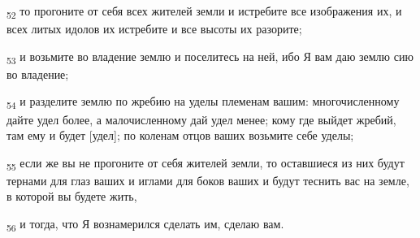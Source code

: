 \begin{tcolorbox}
\textsubscript{52} то прогоните от себя всех жителей земли и истребите все изображения их, и всех литых идолов их истребите и все высоты их разорите;
\end{tcolorbox}
\begin{tcolorbox}
\textsubscript{53} и возьмите во владение землю и поселитесь на ней, ибо Я вам даю землю сию во владение;
\end{tcolorbox}
\begin{tcolorbox}
\textsubscript{54} и разделите землю по жребию на уделы племенам вашим: многочисленному дайте удел более, а малочисленному дай удел менее; кому где выйдет жребий, там ему и будет [удел]; по коленам отцов ваших возьмите себе уделы;
\end{tcolorbox}
\begin{tcolorbox}
\textsubscript{55} если же вы не прогоните от себя жителей земли, то оставшиеся из них будут тернами для глаз ваших и иглами для боков ваших и будут теснить вас на земле, в которой вы будете жить,
\end{tcolorbox}
\begin{tcolorbox}
\textsubscript{56} и тогда, что Я вознамерился сделать им, сделаю вам.
\end{tcolorbox}
